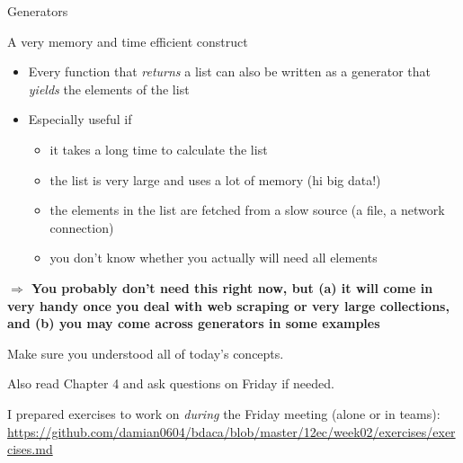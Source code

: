 \documentclass{beamer}
\begin{document}
\begin{frame}[fragile]{Generators}
	\begin{alertblock}{A very memory and time efficient construct}
		\begin{itemize}
			\item Every function that \emph{returns} a list can also be written as a generator that \emph{yields} the elements of the list
			\item Especially useful if
			\begin{itemize}
				\item it takes a long time to calculate the list
				\item the list is very large and uses a lot of memory (hi big data!)
				\item the elements in the list are fetched from a slow source (a file, a network connection)
				\item you don't know whether you actually will need all elements
			\end{itemize}
		\end{itemize}

		\end{alertblock}
		\textbf{$\Rightarrow$ You probably don't need this right now, but (a) it will come in very handy once you deal with web scraping or very large collections, and (b) you may come across generators in some examples}
		\end{frame}



\begin{frame}[standout]
	Make sure you understood all of today's concepts.
	
	Also read Chapter 4 and ask questions on Friday if needed.
	
	 I prepared exercises to work on \emph{during} the Friday meeting (alone or in teams):
	 \large{\url{https://github.com/damian0604/bdaca/blob/master/12ec/week02/exercises/exercises.md}}
\end{frame}


\end{document}
